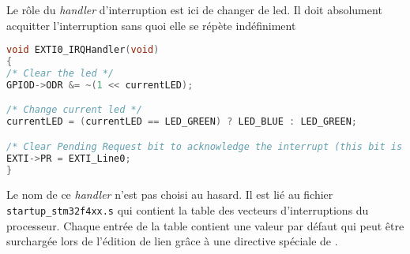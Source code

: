 \documentclass{FicheLecture}
\begin{document}
Le rôle du \emph{handler} d'interruption est ici de changer de led. Il doit absolument acquitter l'interruption sans quoi elle se répète indéfiniment 

\begin{lstlisting}[language=C]
void EXTI0_IRQHandler(void)
{
/* Clear the led */
GPIOD->ODR &= ~(1 << currentLED);

/* Change current led */
currentLED = (currentLED == LED_GREEN) ? LED_BLUE : LED_GREEN;

/* Clear Pending Request bit to acknowledge the interrupt (this bit is cleared by programming it to 1 ! */
EXTI->PR = EXTI_Line0;
}
\end{lstlisting}

Le nom de ce \emph{handler} n'est pas choisi au hasard. Il est lié au fichier \texttt{startup\_stm32f4xx.s} qui contient la table des vecteurs d'interruptions du processeur. Chaque entrée de la table contient une valeur par défaut qui peut être surchargée lors de l'édition de lien grâce à une directive spéciale de .



\end{document}
